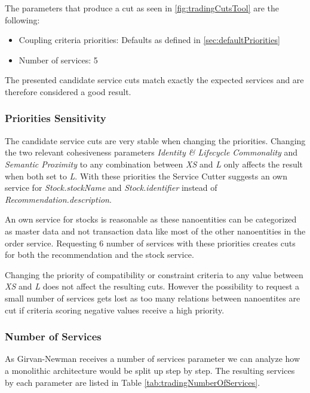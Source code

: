The parameters that produce a cut as seen in \ref{fig:tradingCutsTool} are the following:

\begin{itemize}
\item Coupling criteria priorities: Defaults as defined in \ref{sec:defaultPriorities}
\item Number of services: 5
\end{itemize}

The presented candidate service cuts match exactly the expected services and are therefore considered a good result.

\subsubsection{Priorities Sensitivity}

The candidate service cuts are very stable when changing the priorities. Changing the two relevant cohesiveness parameters \textit{Identity \& Lifecycle Commonality} and \textit{Semantic Proximity} to any combination between \textit{XS} and \textit{L} only affects the result when both set to \textit{L}. With these priorities the Service Cutter suggests an own service for \textit{Stock.stockName} and \textit{Stock.identifier} instead of \textit{Recommendation.description}.

An own service for stocks is reasonable as these nanoentities can be categorized as master data and not transaction data like most of the other nanoentities in the order service. Requesting 6 number of services with these priorities creates cuts for both the recommendation and the stock service. 

Changing the priority of compatibility or constraint criteria to any value between \textit{XS} and \textit{L} does not affect the resulting cuts. However the possibility to request a small number of services gets lost as too many relations between nanoentites are cut if criteria scoring negative values receive a high priority. 

\subsubsection{Number of Services}

As Girvan-Newman receives a number of services parameter we can analyze how a monolithic architecture would be split up step by step. The resulting services by each parameter are listed in Table \ref{tab:tradingNumberOfServices}.

